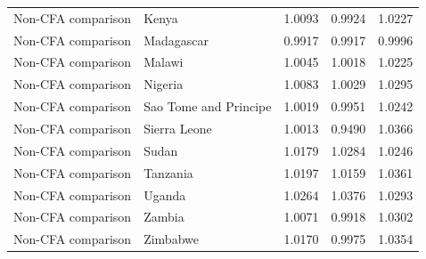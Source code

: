 \begin{table}
\begin{tabular}[t]{llrrr}
Non-CFA comparison & Kenya & 1.0093 & 0.9924 & 1.0227\\
\addlinespace
Non-CFA comparison & Madagascar & 0.9917 & 0.9917 & 0.9996\\
Non-CFA comparison & Malawi & 1.0045 & 1.0018 & 1.0225\\
Non-CFA comparison & Nigeria & 1.0083 & 1.0029 & 1.0295\\
Non-CFA comparison & Sao Tome and Principe & 1.0019 & 0.9951 & 1.0242\\
Non-CFA comparison & Sierra Leone & 1.0013 & 0.9490 & 1.0366\\
\addlinespace
Non-CFA comparison & Sudan & 1.0179 & 1.0284 & 1.0246\\
Non-CFA comparison & Tanzania & 1.0197 & 1.0159 & 1.0361\\
Non-CFA comparison & Uganda & 1.0264 & 1.0376 & 1.0293\\
Non-CFA comparison & Zambia & 1.0071 & 0.9918 & 1.0302\\
Non-CFA comparison & Zimbabwe & 1.0170 & 0.9975 & 1.0354\\
\bottomrule
\end{tabular}
\end{table}